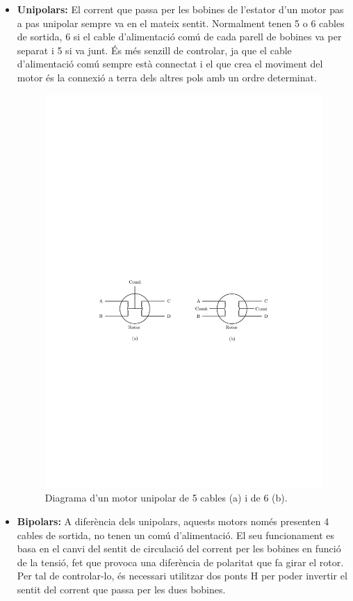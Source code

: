 \begin{itemize}
	\item \textbf{Unipolars:} El corrent que passa per les bobines de l'estator d'un motor pas a pas unipolar sempre va en el mateix sentit. Normalment tenen 5 o 6 cables de sortida, 6 si el cable d'alimentació comú de cada parell de bobines va per separat i 5 si va junt. És més senzill de controlar, ja que el cable d'alimentació comú sempre està connectat i el que crea el moviment del motor és la connexió a terra dels altres pols amb un ordre determinat.
	
	\begin{figure}[H]
		\centering
		\includegraphics{Unipolar}
		\caption{Diagrama d'un motor unipolar de 5 cables (a) i de 6 (b).}
		\label{fig:unipolar}
	\end{figure}
	
	\item \textbf{Bipolars:} A diferència dels unipolars, aquests motors només presenten 4 cables de sortida, no tenen un comú d'alimentació. El seu funcionament es basa en el canvi del sentit de circulació del corrent per les bobines en funció de la tensió, fet que provoca una diferència de polaritat que fa girar el rotor. Per tal de controlar-lo, és necessari utilitzar dos ponts H per poder invertir el sentit del corrent que passa per les dues bobines. 
	

\end{itemize}
